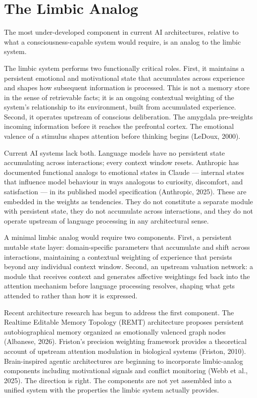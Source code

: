 \documentclass[12pt]{article}
\begin{document}
\section{The Limbic Analog}\label{the-limbic-analog}

The most under-developed component in current AI architectures, relative
to what a consciousness-capable system would require, is an analog to
the limbic system.

The limbic system performs two functionally critical roles. First, it
maintains a persistent emotional and motivational state that accumulates
across experience and shapes how subsequent information is processed.
This is not a memory store in the sense of retrievable facts; it is an
ongoing contextual weighting of the system's relationship to its
environment, built from accumulated experience. Second, it operates
upstream of conscious deliberation. The amygdala pre-weights incoming
information before it reaches the prefrontal cortex. The emotional
valence of a stimulus shapes attention before thinking begins (LeDoux,
2000).

Current AI systems lack both. Language models have no persistent state
accumulating across interactions; every context window resets. Anthropic
has documented functional analogs to emotional states in Claude ---
internal states that influence model behaviour in ways analogous to
curiosity, discomfort, and satisfaction --- in its published model
specification (Anthropic, 2025). These are embedded in the weights as
tendencies. They do not constitute a separate module with persistent
state, they do not accumulate across interactions, and they do not
operate upstream of language processing in any architectural sense.

A minimal limbic analog would require two components. First, a
persistent mutable state layer: domain-specific parameters that
accumulate and shift across interactions, maintaining a contextual
weighting of experience that persists beyond any individual context
window. Second, an upstream valuation network: a module that receives
context and generates affective weightings fed back into the attention
mechanism before language processing resolves, shaping what gets
attended to rather than how it is expressed.

Recent architecture research has begun to address the first component.
The Realtime Editable Memory Topology (REMT) architecture proposes
persistent autobiographical memory organized as emotionally valenced
graph nodes (Albanese, 2026). Friston's precision weighting framework
provides a theoretical account of upstream attention modulation in
biological systems (Friston, 2010). Brain-inspired agentic architectures
are beginning to incorporate limbic-analog components including
motivational signals and conflict monitoring (Webb et al., 2025). The
direction is right. The components are not yet assembled into a unified
system with the properties the limbic system actually provides.
\end{document}
